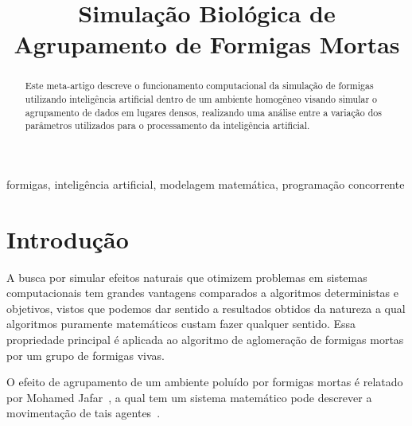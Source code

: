 \documentclass[conference]{IEEEtran}
\begin{document}
\title{Simulação Biológica de Agrupamento de Formigas Mortas}

\author{
\and
{}
}

\maketitle

\begin{abstract}
Este meta-artigo descreve o funcionamento computacional da simulação de formigas utilizando inteligência artificial dentro de um ambiente homogêneo visando simular o agrupamento de dados em lugares densos, realizando uma análise entre a variação dos parâmetros utilizados para o processamento da inteligência artificial.
\end{abstract}

\begin{IEEEkeywords}
formigas, inteligência artificial, modelagem matemática, programação concorrente
\end{IEEEkeywords}


\section{Introdução}

A busca por simular efeitos naturais que otimizem problemas em sistemas computacionais tem grandes vantagens comparados a algoritmos deterministas e objetivos, vistos que podemos dar sentido a resultados obtidos da natureza a qual algoritmos puramente matemáticos custam fazer qualquer sentido. Essa propriedade principal é aplicada ao algoritmo de aglomeração de formigas mortas por um grupo de formigas vivas.

O efeito de agrupamento de um ambiente poluído por formigas mortas é relatado por Mohamed Jafar~\cite{b1}, a qual tem um sistema matemático pode descrever a movimentação de tais agentes~\cite{b2}.
\end{document}
